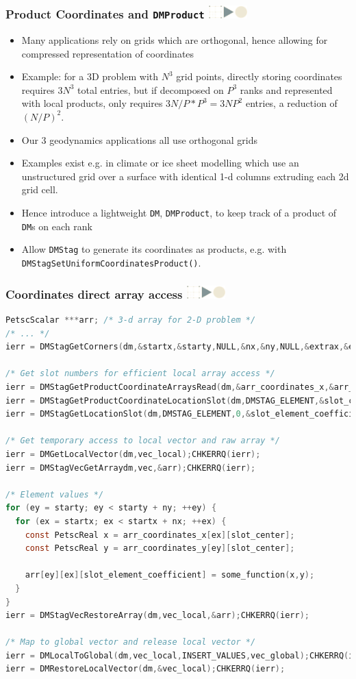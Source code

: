 \documentclass{beamer}
\newcommand\frametitlelogo[1]{\frametitle{#1\hspace{0pt plus 1 filll} \includegraphics[width=42pt]{logo_slides}}}
\begin{document}
\begin{frame}[fragile]
\frametitlelogo{Product Coordinates and \lstinline{DMProduct}}
\begin{itemize}
\item Many applications rely on grids which are orthogonal, hence allowing for compressed representation of coordinates
\item Example: for a 3D problem with $N^3$ grid points, directly storing coordinates requires $3N^3$ total entries, but if decomposed on $P^3$ ranks and represented with local products, only requires $3 N/P * P^3  = 3NP^2$ entries, a reduction of $(N/P)^2$.
\item Our 3 geodynamics applications all use orthogonal grids
\item Examples exist e.g. in climate or ice sheet modelling which use an unstructured grid over a surface with identical 1-d columns extruding each 2d grid cell.
\item Hence introduce a lightweight \lstinline{DM}, \texttt{DMProduct}, to keep track of a product of \lstinline{DM}s on each rank
\item Allow \texttt{DMStag} to generate its coordinates as products, e.g. with \lstinline{DMStagSetUniformCoordinatesProduct()}.
\end{itemize}
\end{frame}


\begin{frame}[fragile]
\frametitlelogo{Coordinates direct array access}
\begin{lstlisting}[language=C,basicstyle=\tiny\ttfamily]
PetscScalar ***arr; /* 3-d array for 2-D problem */
/* ... */
ierr = DMStagGetCorners(dm,&startx,&starty,NULL,&nx,&ny,NULL,&extrax,&extray,NULL);CHKERRQ(ierr);

/* Get slot numbers for efficient local array access */
ierr = DMStagGetProductCoordinateArraysRead(dm,&arr_coordinates_x,&arr_coordinates_y,&arr_coordinates_z);CHKERRQ(ierr);
ierr = DMStagGetProductCoordinateLocationSlot(dm,DMSTAG_ELEMENT,&slot_center);CHKERRQ(ierr);
ierr = DMStagGetLocationSlot(dm,DMSTAG_ELEMENT,0,&slot_element_coefficient);CHKERRQ(ierr);

/* Get temporary access to local vector and raw array */
ierr = DMGetLocalVector(dm,vec_local);CHKERRQ(ierr);
ierr = DMStagVecGetArraydm,vec,&arr);CHKERRQ(ierr);

/* Element values */
for (ey = starty; ey < starty + ny; ++ey) {
  for (ex = startx; ex < startx + nx; ++ex) {
    const PetscReal x = arr_coordinates_x[ex][slot_center];
    const PetscReal y = arr_coordinates_y[ey][slot_center];

    arr[ey][ex][slot_element_coefficient] = some_function(x,y);
  }
}
ierr = DMStagVecRestoreArray(dm,vec_local,&arr);CHKERRQ(ierr);

/* Map to global vector and release local vector */
ierr = DMLocalToGlobal(dm,vec_local,INSERT_VALUES,vec_global);CHKERRQ(ierr);
ierr = DMRestoreLocalVector(dm,&vec_local);CHKERRQ(ierr);
\end{lstlisting}
\end{frame}
\end{document}
